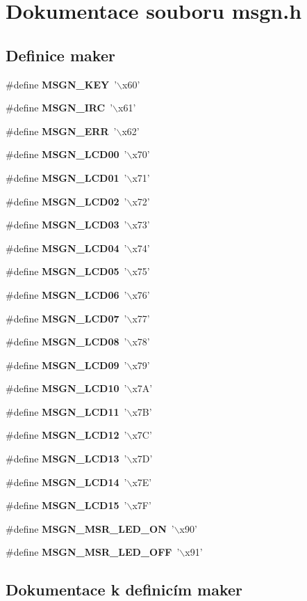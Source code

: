 \section{Dokumentace souboru msgn.h}
\label{msgn_8h}
\subsection*{Definice maker}
\begin{DoxyCompactItemize}
\item 
\#define {\bf MSGN\_\-KEY}~'$\backslash$x60'
\item 
\#define {\bf MSGN\_\-IRC}~'$\backslash$x61'
\item 
\#define {\bf MSGN\_\-ERR}~'$\backslash$x62'
\item 
\#define {\bf MSGN\_\-LCD00}~'$\backslash$x70'
\item 
\#define {\bf MSGN\_\-LCD01}~'$\backslash$x71'
\item 
\#define {\bf MSGN\_\-LCD02}~'$\backslash$x72'
\item 
\#define {\bf MSGN\_\-LCD03}~'$\backslash$x73'
\item 
\#define {\bf MSGN\_\-LCD04}~'$\backslash$x74'
\item 
\#define {\bf MSGN\_\-LCD05}~'$\backslash$x75'
\item 
\#define {\bf MSGN\_\-LCD06}~'$\backslash$x76'
\item 
\#define {\bf MSGN\_\-LCD07}~'$\backslash$x77'
\item 
\#define {\bf MSGN\_\-LCD08}~'$\backslash$x78'
\item 
\#define {\bf MSGN\_\-LCD09}~'$\backslash$x79'
\item 
\#define {\bf MSGN\_\-LCD10}~'$\backslash$x7A'
\item 
\#define {\bf MSGN\_\-LCD11}~'$\backslash$x7B'
\item 
\#define {\bf MSGN\_\-LCD12}~'$\backslash$x7C'
\item 
\#define {\bf MSGN\_\-LCD13}~'$\backslash$x7D'
\item 
\#define {\bf MSGN\_\-LCD14}~'$\backslash$x7E'
\item 
\#define {\bf MSGN\_\-LCD15}~'$\backslash$x7F'
\item 
\#define {\bf MSGN\_\-MSR\_\-LED\_\-ON}~'$\backslash$x90'
\item 
\#define {\bf MSGN\_\-MSR\_\-LED\_\-OFF}~'$\backslash$x91'
\end{DoxyCompactItemize}


\subsection{Dokumentace k definicím maker}
